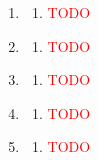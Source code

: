 \begin{enumerate}[label=(\roman*)]
    \item 

        \begin{multicols}{2}
        \begin{enumerate}[label=(\alph*)]
            \item \textcolor{red}{TODO} 
        \end{enumerate}
        \end{multicols}

    \item 

        \begin{multicols}{2}
        \begin{enumerate}[label=(\alph*)]
            \item \textcolor{red}{TODO} 
        \end{enumerate}
        \end{multicols}

    \item 

        \begin{multicols}{2}
        \begin{enumerate}[label=(\alph*)]
            \item \textcolor{red}{TODO} 
        \end{enumerate}
        \end{multicols}

    \item 

        \begin{multicols}{2}
        \begin{enumerate}[label=(\alph*)]
            \item \textcolor{red}{TODO} 
        \end{enumerate}
        \end{multicols}

    \item 

        \begin{multicols}{2}
        \begin{enumerate}[label=(\alph*)]
            \item \textcolor{red}{TODO} 
        \end{enumerate}
        \end{multicols}

\end{enumerate}

